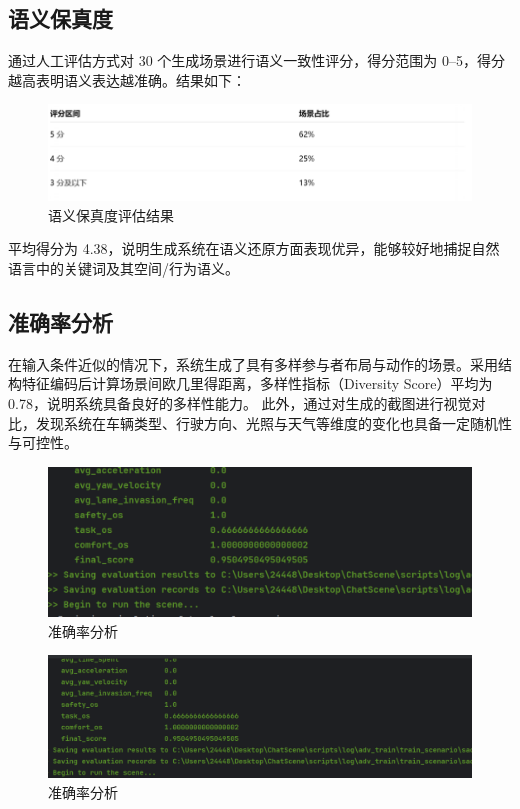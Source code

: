 \subsection{语义保真度}
通过人工评估方式对 30 个生成场景进行语义一致性评分，得分范围为 0–5，得分越高表明语义表达越准确。结果如下：
\begin{figure}[h]
	\centering
	\includegraphics[width=1.0\textwidth]{"images/picture1.pdf"}
	\caption{语义保真度评估结果}
	\label{fig:semantic_fidelity}
\end{figure}

平均得分为 4.38，说明生成系统在语义还原方面表现优异，能够较好地捕捉自然语言中的关键词及其空间/行为语义。

\subsection{准确率分析}
在输入条件近似的情况下，系统生成了具有多样参与者布局与动作的场景。采用结构特征编码后计算场景间欧几里得距离，多样性指标（Diversity Score）平均为 0.78，说明系统具备良好的多样性能力。
此外，通过对生成的截图进行视觉对比，发现系统在车辆类型、行驶方向、光照与天气等维度的变化也具备一定随机性与可控性。
\begin{figure}[h]
	\centering
	\includegraphics[width=1.0\textwidth]{"images/result2.pdf"}
	\caption{准确率分析}
	\label{fig:accuracy_analysis}
\end{figure}

\begin{figure}[h]
	\centering
	\includegraphics[width=1.0\textwidth]{"images/result1.pdf"}
	\caption{准确率分析}
	\label{fig:accuracy_analysis}
\end{figure}

